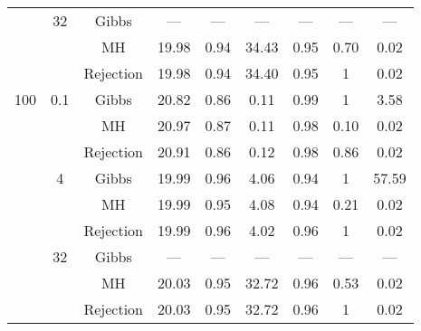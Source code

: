{\begin{tabular}{ccccccccc}
   & 32 & Gibbs & --- & --- & --- & --- & --- & --- \\ 
   &  & MH & 19.98 & 0.94 & 34.43 & 0.95 & 0.70 & 0.02 \\ 
   &  & Rejection & 19.98 & 0.94 & 34.40 & 0.95 & 1 & 0.02 \\ 
   \cmidrule{1-9}100 & 0.1 & Gibbs & 20.82 & 0.86 & 0.11 & 0.99 & 1 & 3.58 \\ 
   &  & MH & 20.97 & 0.87 & 0.11 & 0.98 & 0.10 & 0.02 \\ 
   \vspace{0.2cm} &  & Rejection & 20.91 & 0.86 & 0.12 & 0.98 & 0.86 & 0.02 \\ 
   & 4 & Gibbs & 19.99 & 0.96 & 4.06 & 0.94 & 1 & 57.59 \\ 
   &  & MH & 19.99 & 0.95 & 4.08 & 0.94 & 0.21 & 0.02 \\ 
   \vspace{0.2cm} &  & Rejection & 19.99 & 0.96 & 4.02 & 0.96 & 1 & 0.02 \\ 
   & 32 & Gibbs & --- & --- & --- & --- & --- & --- \\ 
   &  & MH & 20.03 & 0.95 & 32.72 & 0.96 & 0.53 & 0.02 \\ 
   &  & Rejection & 20.03 & 0.95 & 32.72 & 0.96 & 1 & 0.02 \\ 
   \bottomrule 
\end{tabular}
}
